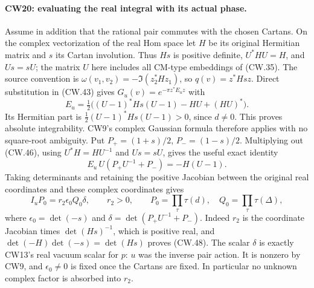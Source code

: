 \paragraph{CW20: evaluating the real integral with its actual phase.}
Assume in addition that the rational pair commutes with the chosen
Cartans.  On the complex vectorization of the real Hom space let
$H$ be its original Hermitian matrix and $s$ its Cartan involution.
Thus $Hs$ is positive definite, $U^*HU=H$, and $Us=sU$;
the matrix $U$ here includes all CM-type embeddings of (CW.35).
The source convention is
$\omega(v_1,v_2)=-\Im(z_2^*Hz_1)$, so
$q(v)=z^*Hs z$.  Direct substitution in (CW.43) gives
$G_u(v)=e^{-\pi z^*E_u z}$ with
\[
 E_u=\tfrac12\bigl((U-1)^*Hs(U-1)-HU+(HU)^*\bigr).
                                                               \tag{CW.46}
\]
Its Hermitian part is
$\tfrac12(U-1)^*Hs(U-1)>0$, since $d\ne0$.
This proves absolute integrability.  CW9's complex Gaussian
formula therefore applies with no square-root ambiguity.
Put $P_+=(1+s)/2$, $P_-=(1-s)/2$.
Multiplying out (CW.46), using $U^*H=HU^{-1}$ and $Us=sU$,
gives the useful exact identity
\[
 E_u\,U(P_+U^{-1}+P_-)=-H(U-1).                       \tag{CW.47}
\]
Taking determinants and retaining the positive Jacobian between
the original real coordinates and these complex coordinates gives
\[
 I_u P_0=r_2\epsilon_0 Q_0\delta,\qquad r_2>0,\qquad
 P_0=\prod_\tau\tau(d),\quad Q_0=\prod_\tau\tau(\Delta),
                                                               \tag{CW.48}
\]
where $\epsilon_0=\det(-s)$ and
$\delta=\det(P_+U^{-1}+P_-)$.
Indeed $r_2$ is the coordinate Jacobian times $\det(Hs)^{-1}$,
which is positive real, and
$\det(-H)\det(-s)=\det(Hs)$ proves (CW.48).
The scalar $\delta$ is exactly CW13's real vacuum scalar for
$p$: $u$ was the inverse pair action.  It is nonzero by CW9,
and $\epsilon_0\ne0$ is fixed once the Cartans are fixed.
In particular no unknown complex factor is absorbed into $r_2$.

